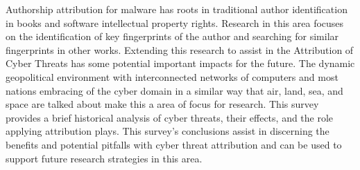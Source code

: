 \documentclass[12pt]{report}
\begin{document}
Authorship attribution for malware has roots in traditional author identification in books and software intellectual property rights.  Research in this area focuses on the identification of key fingerprints of the author and searching for similar fingerprints in other works.  Extending this research to assist in the Attribution of Cyber Threats has some potential important impacts for the future.  The dynamic geopolitical environment with interconnected networks of computers and most nations embracing of the cyber domain in a similar way that air, land, sea, and space are talked about make this a area of focus for research.  This survey provides a brief historical analysis of cyber threats, their effects, and the role applying attribution plays.  This survey’s conclusions assist in discerning the benefits and potential pitfalls with cyber threat attribution and can be used to support future research strategies in this area.  
\end{document}
